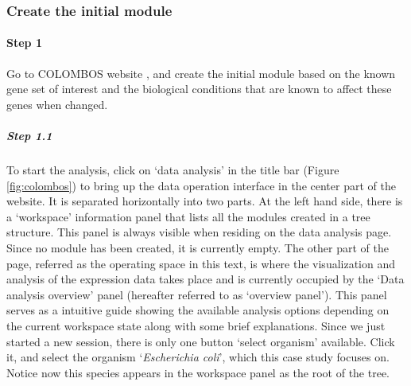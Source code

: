 \subsubsection{Create the initial module}

\begin{small} %

\paragraph{Step 1} 
Go to COLOMBOS website \cite{COLOMBOS}, and create the initial module based on
the known gene set of interest and the biological conditions that are known to
affect these genes when changed.

\subparagraph{Step 1.1}	To start the analysis, click on `data 
analysis' in the title bar (Figure \ref{fig:colombos}) to bring up the data
operation interface in the center part of the website.  It is separated
horizontally into two parts. At the left hand side, there is a `workspace'
information panel that lists all the modules created in a tree structure. This
panel is always visible when residing on the data analysis page.
Since no module has been created, it is currently empty.
%
The other part of the page, referred as the operating space in this text, is
where the visualization and analysis of the expression data takes place and is
currently occupied by the `Data analysis overview' panel (hereafter referred to
as `overview panel'). This panel serves as a intuitive guide showing the
available analysis options depending on the current workspace state along with
some brief explanations.\vspace{1.5mm}
%
Since we just started a new session, there is only one button `select organism'
available. Click it, and select the organism `\textit{Escherichia coli}', which
this case study focuses on. Notice now this species appears in the workspace
panel as the root of the tree.



\end{small}
